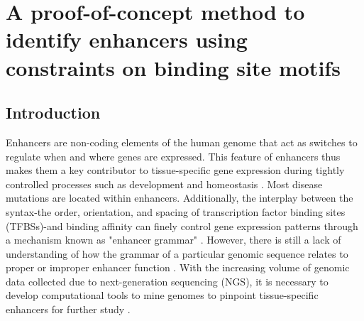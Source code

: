 \chapter{A proof-of-concept method to identify enhancers using constraints on binding site motifs}
\label{chap:Proof of concept method to identify enhancers}

\section{Introduction}

Enhancers are non-coding elements of the human genome that act as switches to regulate when and where genes are expressed. This feature of enhancers thus makes them a key contributor to tissue-specific gene expression during tightly controlled processes such as development and homeostasis \cite{levine2010,heinz2010,small1992,spitz2012,liu2012a,swanson2010a}. Most disease mutations are located within enhancers. Additionally, the interplay between the syntax-the order, orientation, and spacing of transcription factor binding sites (TFBSs)-and binding affinity can finely control gene expression patterns through a mechanism known as "enhancer grammar" \cite{maurano2012,tak2015a,visel2009,jindal2021}. However, there is still a lack of understanding of how the grammar of a particular genomic sequence relates to proper or improper enhancer function \cite{jindal2021}. With the increasing volume of genomic data collected due to next-generation sequencing (NGS), it is necessary to develop computational tools to mine genomes to pinpoint tissue-specific enhancers for further study \cite{leonelli2019,marx2013,pal2020,stephens2015}. 

